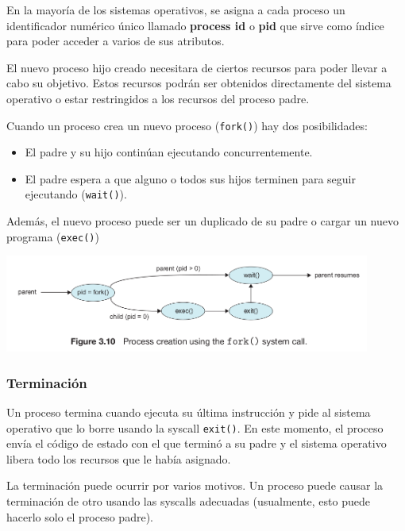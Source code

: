 En la mayoría de los sistemas operativos, se asigna a cada proceso un identificador numérico único llamado \textbf{process id} o \textbf{pid} que sirve como índice para poder acceder a varios de sus atributos.

El nuevo proceso hijo creado necesitara de ciertos recursos para poder llevar a cabo su objetivo. Estos recursos podrán ser obtenidos directamente del sistema operativo o estar restringidos a los recursos del proceso padre.

Cuando un proceso crea un nuevo proceso (\texttt{fork()}) hay dos posibilidades:

\begin{itemize}
	\item El padre y su hijo continúan ejecutando concurrentemente.
	\item El padre espera a que alguno o todos sus hijos terminen para seguir ejecutando (\texttt{wait()}).
\end{itemize}

Además, el nuevo proceso puede ser un duplicado de su padre o cargar un nuevo programa (\texttt{exec()})

\begin{center}
	\includegraphics[width=0.9\textwidth]{imagenes/process_creation.png}
	\end{center}

\subsubsection{Terminación}
Un proceso termina cuando ejecuta su última instrucción y pide al sistema operativo que lo borre usando la syscall \texttt{exit()}. En este momento, el proceso envía el código de estado con el que terminó a su padre y el sistema operativo libera todo los recursos que le había asignado.

La terminación puede ocurrir por varios motivos. Un proceso puede causar la terminación de otro usando las syscalls adecuadas (usualmente, esto puede hacerlo solo el proceso padre).

